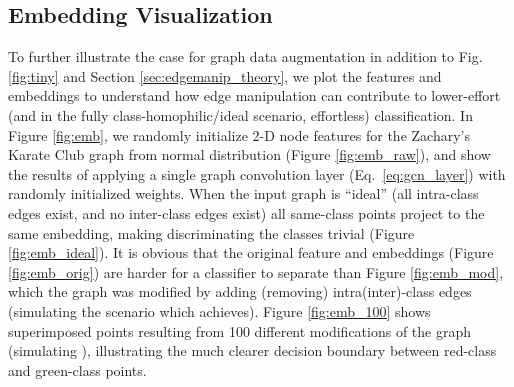 \documentclass[letterpaper]{article} \usepackage{aaai21}  \usepackage{times}  \usepackage{helvet} \usepackage{courier}  \usepackage[hyphens]{url}  \usepackage{graphicx} \urlstyle{rm} \def\UrlFont{\rm}  \usepackage{natbib}  \usepackage{caption} \frenchspacing  \setlength{\pdfpagewidth}{8.5in}  \setlength{\pdfpageheight}{11in}
\begin{document}
\subsection{Embedding Visualization}
\label{}

To further illustrate the case for graph data augmentation in addition to Fig. \ref{fig:tiny} and Section \ref{sec:edgemanip_theory}, we plot the features and embeddings to understand how edge manipulation can contribute to lower-effort (and in the fully class-homophilic/ideal scenario, effortless) classification. In Figure \ref{fig:emb}, we randomly initialize 2-D node features for the Zachary’s Karate Club graph from normal distribution  (Figure \ref{fig:emb_raw}), and show the results of applying a single graph convolution layer (Eq.~\ref{eq:gcn_layer}) with randomly initialized weights. When the input graph is ``ideal'' (all intra-class edges exist, and no inter-class edges exist) all same-class points project to the same embedding, making discriminating the classes trivial (Figure \ref{fig:emb_ideal}). It is obvious that the original feature and embeddings (Figure \ref{fig:emb_orig}) are harder for a classifier to separate than Figure \ref{fig:emb_mod}, which the graph was modified by adding (removing) intra(inter)-class edges (simulating the scenario which \methodtwo achieves). Figure \ref{fig:emb_100} shows superimposed points resulting from 100 different modifications of the graph (simulating \method), illustrating the much clearer decision boundary between red-class and green-class points.



 
\end{document}
